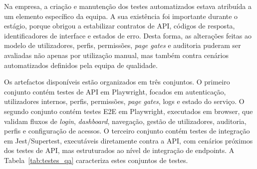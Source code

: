 Na empresa, a criação e manutenção dos testes automatizados estava atribuída a um elemento específico da equipa. A sua existência foi importante durante o estágio, porque obrigou a estabilizar contratos de \gls{API}, códigos de resposta, identificadores de interface e estados de erro. Desta forma, as alterações feitas ao modelo de utilizadores, perfis, permissões, \textit{page gates} e auditoria puderam ser avaliadas não apenas por utilização manual, mas também contra cenários automatizados definidos pela equipa de qualidade.

Os artefactos disponíveis estão organizados em três conjuntos. O primeiro conjunto contém testes de \gls{API} em Playwright, focados em autenticação, utilizadores internos, perfis, permissões, \textit{page gates}, logs e estado do serviço. O segundo conjunto contém testes \gls{E2E} em Playwright, executados em browser, que validam fluxos de \textit{login}, \textit{dashboard}, navegação, gestão de utilizadores, auditoria, perfis e configuração de acessos. O terceiro conjunto contém testes de integração em Jest/Supertest, executáveis diretamente contra a \gls{API}, com cenários próximos dos testes de \gls{API}, mas estruturados ao nível de integração de endpoints. A Tabela~\ref{tab:testes_qa} caracteriza estes conjuntos de testes.


